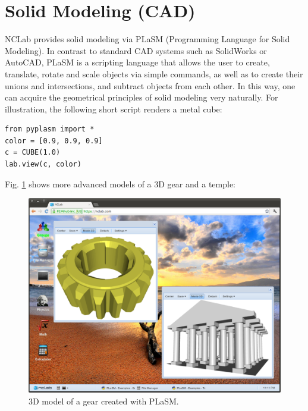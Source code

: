\documentclass[article,A4,12pt]{llncs}
\begin{document}
\section{Solid Modeling (CAD)}

NCLab provides solid modeling via PLaSM (Programming Language for Solid Modeling). In contrast to standard
CAD systems such as SolidWorks or AutoCAD, PLaSM is a scripting language that 
allows the user to create, translate, rotate and scale objects via simple commands, 
as well as to create their unions and intersections, and subtract objects from each other.  
In this way, one can acquire the geometrical principles of solid modeling very naturally.
For illustration, the following short script renders a metal cube:
\newpage
\begin{verbatim}
from pyplasm import *
color = [0.9, 0.9, 0.9]
c = CUBE(1.0)
lab.view(c, color)
\end{verbatim}
Fig. \ref{fig:plasm1} shows more advanced models of a 3D gear and 
a temple:

\begin{figure}[!ht]
\begin{center}
\includegraphics[width=\textwidth]{img/plasm1.png}
\end{center}
\caption{3D model of a gear created with PLaSM.}
\label{fig:plasm1}
\end{figure}
\end{document}
